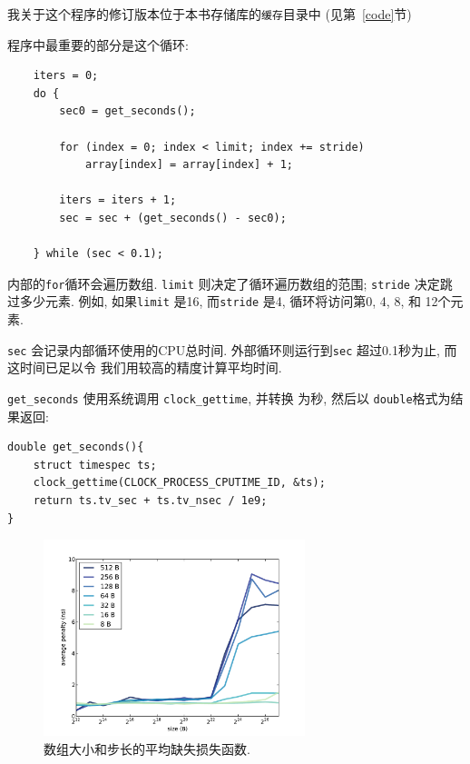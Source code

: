 \documentclass[12pt]{book}
\begin{document}
{%
我关于这个程序的修订版本位于本书存储库的{\tt 缓存}目录中
(见第~\ref{code}节)

程序中最重要的部分是这个循环:

\begin{verbatim}
    iters = 0;
    do {
        sec0 = get_seconds();

        for (index = 0; index < limit; index += stride) 
            array[index] = array[index] + 1;
        
        iters = iters + 1; 
        sec = sec + (get_seconds() - sec0);
        
    } while (sec < 0.1);
\end{verbatim}

内部的{\tt for}循环会遍历数组. {\tt limit} 则决定了循环遍历数组的范围;
{\tt stride} 决定跳过多少元素. 例如, 如果{\tt limit} 是16, 而{\tt stride} 是4,
循环将访问第0, 4, 8, 和 12个元素.

{\tt sec} 会记录内部循环使用的CPU总时间.
外部循环则运行到{\tt sec} 超过0.1秒为止, 而这时间已足以令
我们用较高的精度计算平均时间.

\verb"get_seconds" 使用系统调用 \verb"clock_gettime", 并转换
为秒, 然后以 {\tt double}格式为结果返回:

\begin{verbatim}
double get_seconds(){
    struct timespec ts;
    clock_gettime(CLOCK_PROCESS_CPUTIME_ID, &ts);
    return ts.tv_sec + ts.tv_nsec / 1e9;
}
\end{verbatim}

\begin{figure}
\centerline{\includegraphics[width=3in]{figs/cache_data.pdf}}
\caption{数组大小和步长的平均缺失损失函数.}
\label{cachedata}
\end{figure}

}
\end{document}
